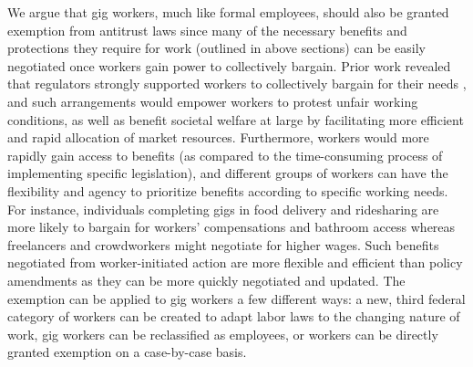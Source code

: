We argue that gig workers, much like formal employees, should also be granted exemption from antitrust laws since many of the necessary benefits and protections they require for work (outlined in above sections) can be easily negotiated once workers gain power to collectively bargain. Prior work revealed that regulators strongly supported workers to collectively bargain for their needs \cite{codesign}, and such arrangements would empower workers to protest unfair working conditions, as well as benefit societal welfare at large by facilitating more efficient and rapid allocation of market resources. Furthermore, workers would more rapidly gain access to benefits (as compared to the time-consuming process of implementing specific legislation), and different groups of workers can have the flexibility and agency to prioritize benefits according to specific working needs. For instance, individuals completing gigs in food delivery and ridesharing are more likely to bargain for workers' compensations and bathroom access whereas freelancers and crowdworkers might negotiate for higher wages. Such benefits negotiated from worker-initiated action are more flexible and efficient than policy amendments as they can be more quickly negotiated and updated. The exemption can be applied to gig workers a few different ways: a new, third federal category of workers can be created to adapt labor laws to the changing nature of work, gig workers can be reclassified as employees, or workers can be directly granted exemption on a case-by-case basis.


